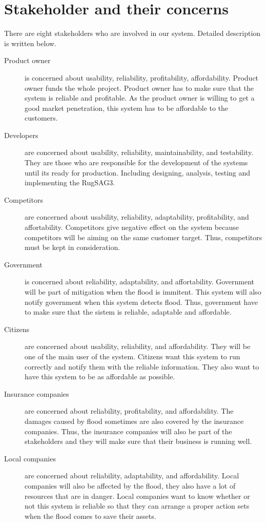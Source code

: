 \section{Stakeholder and their concerns}


There are eight stakeholders who are involved in our system. Detailed description is written below.

\begin{description}
\item[Product owner] is concerned about usability, reliability, profitability, affordability. Product owner funds the whole project. Product owner has to make sure that the system is reliable and profitable. As the product owner is willing to get a good market penetration, this system has to be affordable to the customers.
\item[Developers] are concerned about usability, reliability, maintainability, and testability. They are those who are responsible for the development of the systems until its ready for production. Including designing, analysis, testing and implementing the RugSAG3.
\item[Competitors] are concerned about usability, reliability, adaptability, profitability, and affortability. Competitors give negative effect on the system because competitors will be aiming on the same customer target. Thus, competitors must be kept in consideration. 
\item[Government] is concerned about reliability, adaptability, and affortability. Government will be part of mitigation when the flood is immitent. This system will also notify government when this system detects flood. Thus, government have to make sure that the sistem is reliable, adaptable and affordable.
\item[Citizens] are concerned about usability, reliability, and affordability. They will be one of the main user of the system. Citizens want this system to run correctly and notify them with the reliable information. They also want to have this system to be as affordable as possible.
\item[Insurance companies] are concerned about reliability, profitability, and affordability. The damages caused by flood sometimes are also covered by the insurance companies. Thus, the insurance companies will also be part of the stakeholders and they will make sure that their business is running well.
\item[Local companies] are concerned about reliability, adaptability, and affordability. Local companies will also be affected by the flood, they also have a lot of resources that are in danger. Local companies want to know whether or not this system is reliable so that they can arrange a proper action sets when the flood comes to save their assets.

\end{description}
